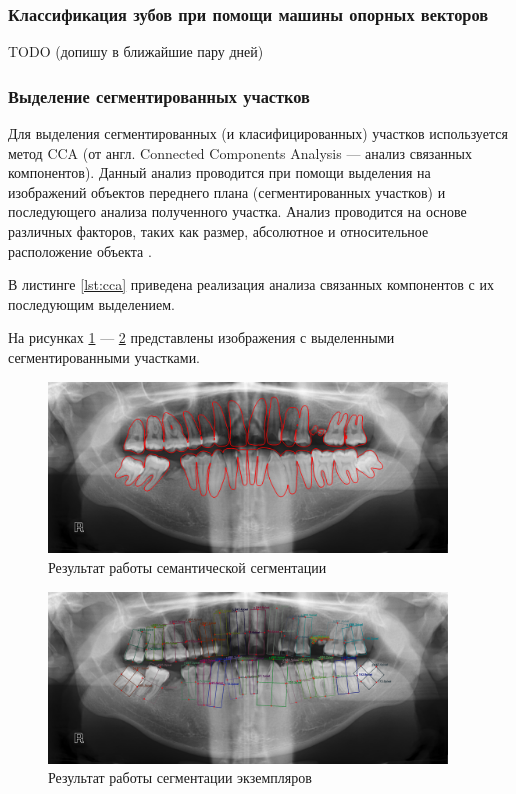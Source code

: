 \subsubsection{Классификация зубов при помощи машины опорных векторов}

TODO (допишу в ближайшие пару дней)

\subsubsection{Выделение сегментированных участков}

Для выделения сегментированных (и класифицированных) участков используется метод CCA (от англ. Connected Components Analysis --- анализ связанных компонентов). Данный анализ проводится при помощи выделения на изображений объектов переднего плана (сегментированных участков) и последующего анализа полученного участка. Анализ проводится на основе различных факторов, таких как размер, абсолютное и относительное расположение объекта \cite{cca}.

В листинге \ref{lst:cca} приведена реализация анализа связанных компонентов с их последующим выделением.



На рисунках \ref{fig:segmented} --- \ref{fig:segmented_cca} представлены изображения с выделенными сегментированными участками.

\begin{figure}[H]
	\centering
	\includegraphics[width=400px]{img/segmented.png}
	\caption{Результат работы семантической сегментации}
	\label{fig:segmented}
\end{figure}

\begin{figure}[H]
	\centering
	\includegraphics[width=400px]{img/segmented_cca.png}
	\caption{Результат работы сегментации экземпляров}
	\label{fig:segmented_cca}
\end{figure}


